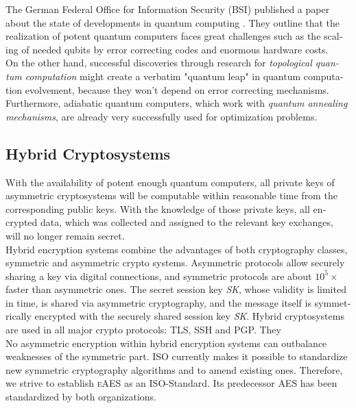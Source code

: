 \documentclass[a4paper,11pt]{article}
\begin{document}
\begin{otherlanguage}{english}
The German Federal Office for Information Security (BSI) published a paper about the state of developments in quantum computing \cite{BSI}. They outline that the realization of potent quantum computers faces great challenges such as the scaling of needed qubits by error correcting codes and enormous hardware costs. \\
On the other hand, successful discoveries through research for \textit{topological quantum computation} \cite{TQB} might create a verbatim "quantum leap" in quantum computation evolvement, because they won't depend on error correcting mechanisms. Furthermore, adiabatic quantum computers, which work with \textit{quantum annealing mechanisms}, are already very successfully used for optimization problems.\\

\subsection{Hybrid Cryptosystems}

\noindent
With the availability of potent enough quantum computers, all private keys of asymmetric cryptosystems will be computable within reasonable time from the corresponding public keys. With the knowledge of those private keys, all encrypted data, which was collected and assigned to the relevant key exchanges, will no longer remain secret. \\

\noindent
Hybrid encryption systems combine the advantages of both cryptography classes, symmetric and asymmetric crypto systems. Asymmetric protocols allow securely sharing a key via digital connections, and symmetric protocols are about $10^5 \times$ faster than asymmetric ones. The secret session key \textit{SK}, whose validity is limited in time, is shared via asymmetric cryptography, and the message itself is symmetrically encrypted with the securely shared session key \textit{SK}. Hybrid cryptosystems are used in all major crypto protocols: TLS, SSH and PGP. They\\

\noindent
No asymmetric encryption within hybrid encryption systems can outbalance weaknesses of the symmetric part. ISO currently makes it possible to standardize new symmetric cryptography algorithms and to amend existing ones. Therefore, we strive to establish \textsc{eAES} as an ISO-Standard. Its predecessor \textsc{AES} has been standardized by both organizations. \\


\end{otherlanguage}
\end{document}
